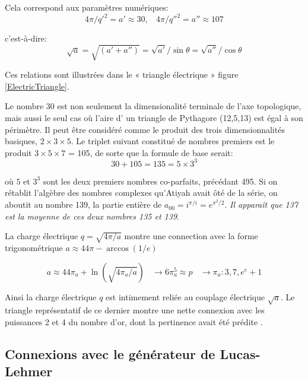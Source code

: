 \documentclass[a4paper,9pt]{article}
\newcounter{row}
\begin{document}
 
  Cela correspond aux paramètres numériques:
\begin{equation}
 4\pi / {q'}^2  = {a'}  \approx 30 ,    ~~~~         4\pi / {q''}^2  = {a''}  \approx 107
 \end{equation}
 
c'est-à-dire:
\begin{equation}
\sqrt{a}  = \sqrt{({a'} + {a''})} = \sqrt{a'} / \sin\theta  = \sqrt{a''}  / \cos\theta
 \end{equation}


Ces relations sont illustrées dans le « triangle électrique » figure \ref{ElectricTriangle}. 

Le nombre 30 est non seulement la dimensionalité terminale de l’axe topologique, mais aussi le seul cas où l’aire d’ un triangle de Pythagore (12,5,13) est égal à son périmètre.  Il peut être considéré comme le produit des trois dimensionnalités basiques, $2 \times 3 \times 5$. Le triplet suivant constitué de nombres premiers est le produit $3 \times 5 \times 7$ = 105, de sorte que la formule de base serait:
\begin{equation}
30 + 105 = 135 = 5 \times 3^3
\end{equation}

où $5$ et $3^3$ sont les deux premiers nombres co-parfaits, précédant 495. Si on rétablit l’algèbre des nombres complexes qu’Atiyah avait ôté de la série, on aboutit au nombre 139, la partie entière de $a_{00} = i^{\pi/i} = e^{\pi^2/2}$. \textit{Il apparaît que 137 est la moyenne de ces deux nombres 135 et 139}. 




La charge électrique $q = \sqrt{4\pi/a} $ montre une connection avec la forme trigonométrique \cite{Sanchez2} $a \approx 44\pi - \arccos(1/e)$

\begin{equation}
a \approx 44\pi_a + \ln(\sqrt {4\pi_a/a})     ~~~~ \rightarrow 6\pi_a^5 \approx p ~~~~ \rightarrow \pi_a : 3, 7, e^e + 1
 \end{equation}

Ainsi la charge électrique $q$  est intimement reliée au couplage électrique $\sqrt a$. Le triangle représentatif de ce dernier montre une nette connexion avec les puissances 2 et 4 du nombre d'or, dont la pertinence avait été prédite \cite{Sanchez1}.



 


\subsection{Connexions avec le générateur de Lucas-Lehmer}
\end{document}
